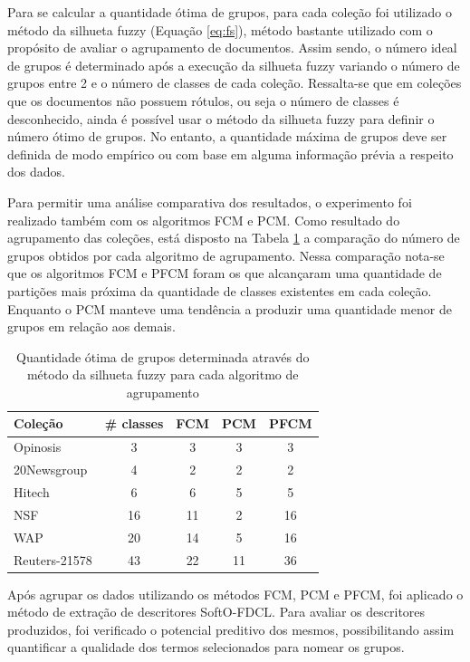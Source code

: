 Para se calcular a quantidade ótima de grupos, para cada coleção foi utilizado o
método da silhueta fuzzy (Equação \ref{eq:fs}), método bastante utilizado com o propósito de avaliar
o agrupamento de documentos. Assim sendo, o número ideal de grupos é determinado após a execução da
silhueta fuzzy variando o número de grupos entre 2 e o número de classes de cada coleção.
Ressalta-se que em coleções que os documentos não possuem rótulos, ou seja o número de classes é
desconhecido, ainda é possível usar o método da silhueta fuzzy para definir o número ótimo de
grupos. No entanto, a quantidade máxima de grupos deve ser definida de modo empírico ou com base em
alguma informação prévia a respeito dos dados. 

Para permitir uma análise comparativa dos resultados, o experimento foi realizado também com os
algoritmos FCM e PCM.  Como resultado do agrupamento das coleções, está disposto na Tabela
\ref{table:pfcmclusters} a comparação do número de grupos obtidos por cada algoritmo de agrupamento.
Nessa comparação nota-se que os algoritmos FCM e PFCM foram os que alcançaram uma quantidade de
partições mais próxima da quantidade de classes existentes em cada coleção. Enquanto o PCM manteve
uma tendência a produzir uma quantidade menor de grupos em relação aos demais.

\begin{table}[!htp]
  \centering
  \begin{tabular}{ |l|c|c|c|c|}
    \hline
    {\bf Coleção} & {\bf \# classes} & {\bf FCM} & {\bf PCM} & {\bf PFCM} \\
    \hline
    Opinosis & 3 & 3 & 3 & 3 \\
    \hline
    20Newsgroup & 4 & 2 & 2 & 2 \\
    \hline
    Hitech & 6 & 6 & 5 & 5 \\
    \hline
    NSF & 16 & 11 & 2 & 16 \\
    \hline
    WAP & 20 & 14 & 5 & 16 \\
    \hline
    Reuters-21578 & 43 & 22 & 11 & 36 \\
    \hline
  \end{tabular}
  \caption{Quantidade ótima de grupos determinada através do método da silhueta fuzzy para cada
  algoritmo de agrupamento}
  \label{table:pfcmclusters}
\end{table}

Após agrupar os dados utilizando os métodos FCM, PCM e PFCM, foi aplicado o método de extração 
de descritores SoftO-FDCL. Para avaliar os descritores produzidos, foi verificado o
potencial preditivo dos mesmos, possibilitando assim quantificar a qualidade dos
termos selecionados para nomear os grupos. 

